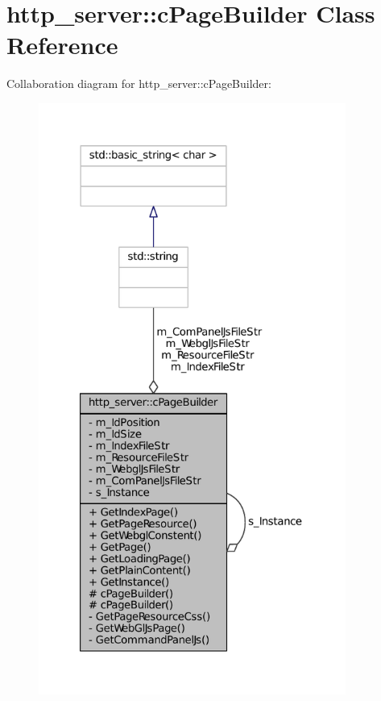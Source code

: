 \hypertarget{classhttp__server_1_1cPageBuilder}{
\section{http\-\_\-server\-:\-:c\-Page\-Builder \-Class \-Reference}
\label{classhttp__server_1_1cPageBuilder}
}


\-Collaboration diagram for http\-\_\-server\-:\-:c\-Page\-Builder\-:
\nopagebreak
\begin{figure}[H]
\begin{center}
\leavevmode
\includegraphics[height=550pt]{classhttp__server_1_1cPageBuilder__coll__graph}
\end{center}
\end{figure}
